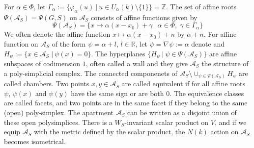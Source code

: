 \documentclass[11 pt]{article}
\numberwithin{equation}{subsection}
\theoremstyle{definition}
\theoremstyle{remark}
\theoremstyle{conjecture}
\newcommand{\Z}{\mathbb Z}
\newcommand{\R}{\mathbb R}
\newcommand{\A}{\mathcal A}
\begin{document}
For $\alpha \in \Phi$, let $\Gamma_\alpha:=\{ \varphi_\alpha(u)\:|\: u \in U_\alpha(k)\setminus\{1\}\}=\Z$. The set of affine roots $\Psi(\A_S)=\Psi(G,S)$ on $\A_S$ consists of affine functions given by 
\begin{equation*}
   \Psi(\A_S)=\{ x \mapsto \alpha(x-x_0)+\gamma\:|\: \alpha \in \Phi,\;\gamma \in  \Gamma_\alpha\}
\end{equation*}
We often denote the affine function $x \mapsto \alpha(x-x_0)+n$ by $\alpha+n$. For affine function on $\A_S$ of the form $\psi = \alpha +l$, $l \in \R$, let $\dot \psi=\nabla \psi:= \alpha $ denote and $H_\psi :=\{ x \in \A_S\;|\: \psi(x)=0\}$. The hyperplanes $\{H_\psi\:|\: \psi \in \Psi(\A_S)\}$ are affine subspaces of codimension $1$, often called a wall and they give $\A_S$ the structure of a poly-simplicial complex. The connected componenets of $\A_S \setminus \cup_{\psi \in \Psi(\A_S)}H_\psi$ are called chambers. Two points $x,y \in \A_S $  are called equivalent if for all affine roots $\psi$, $\psi(x)$ and $\psi(y)$ have the same sign or are both $0$. The equivalence classes are called facets, and two points are in the same facet if they belong to the same (open) poly-simplex. The apartment $\A_S$ can be written as a disjoint union of these open polysimplices. There is a $W_S$-invariant scalar product on $V$, and if we equip $\A_S$ with the metric defined by the scalar product, the $N(k)$ action on $\A_S$ becomes isometrical. \par
\end{document}
